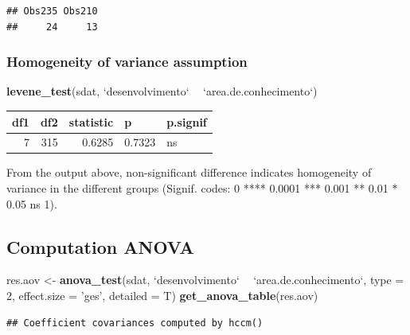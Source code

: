 \documentclass[]{article}
\newenvironment{Shaded}{\begin{snugshade}}{\end{snugshade}}
\newcommand{\DataTypeTok}[1]{\textcolor[rgb]{0.13,0.29,0.53}{#1}}
\newcommand{\DecValTok}[1]{\textcolor[rgb]{0.00,0.00,0.81}{#1}}
\newcommand{\KeywordTok}[1]{\textcolor[rgb]{0.13,0.29,0.53}{\textbf{#1}}}
\newcommand{\NormalTok}[1]{#1}
\newcommand{\OperatorTok}[1]{\textcolor[rgb]{0.81,0.36,0.00}{\textbf{#1}}}
\newcommand{\StringTok}[1]{\textcolor[rgb]{0.31,0.60,0.02}{#1}}
\begin{document}
\begin{verbatim}
## Obs235 Obs210 
##     24     13
\end{verbatim}

\hypertarget{homogeneity-of-variance-assumption}{%
\subsubsection{Homogeneity of variance
assumption}\label{homogeneity-of-variance-assumption}}

\begin{Shaded}
\begin{Highlighting}[]
\KeywordTok{levene_test}\NormalTok{(sdat, }\StringTok{`}\DataTypeTok{desenvolvimento}\StringTok{`} \OperatorTok{~}\StringTok{ `}\DataTypeTok{area.de.conhecimento}\StringTok{`}\NormalTok{)}
\end{Highlighting}
\end{Shaded}

\begin{longtable}[]{@{}rrrll@{}}
\toprule
df1 & df2 & statistic & p & p.signif\tabularnewline
\midrule
\endhead
7 & 315 & 0.6285 & 0.7323 & ns\tabularnewline
\bottomrule
\end{longtable}

From the output above, non-significant difference indicates homogeneity
of variance in the different groups (Signif. codes: 0 **** 0.0001 ***
0.001 ** 0.01 * 0.05 ns 1).

\hypertarget{computation-anova}{%
\subsection{Computation ANOVA}\label{computation-anova}}

\begin{Shaded}
\begin{Highlighting}[]
\NormalTok{res.aov <-}\StringTok{ }\KeywordTok{anova_test}\NormalTok{(sdat, }\StringTok{`}\DataTypeTok{desenvolvimento}\StringTok{`} \OperatorTok{~}\StringTok{ `}\DataTypeTok{area.de.conhecimento}\StringTok{`}\NormalTok{, }\DataTypeTok{type =} \DecValTok{2}\NormalTok{, }\DataTypeTok{effect.size =} \StringTok{'ges'}\NormalTok{, }\DataTypeTok{detailed =}\NormalTok{ T)}
\KeywordTok{get_anova_table}\NormalTok{(res.aov)}
\end{Highlighting}
\end{Shaded}

\begin{verbatim}
## Coefficient covariances computed by hccm()
\end{verbatim}
\end{document}
